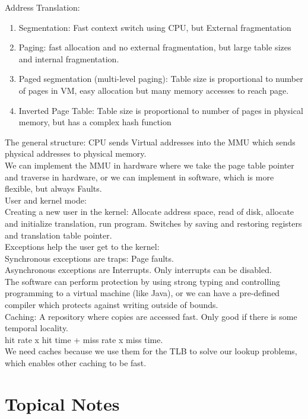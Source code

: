 \documentclass[paper=a4, fontsize=11pt]{scrartcl} %
\numberwithin{equation}{section} %
\numberwithin{figure}{section} %
\numberwithin{table}{section} %
\begin{document}
Address Translation:
\begin{enumerate}
	\item Segmentation: Fast context switch using CPU, but External fragmentation
    \item Paging: fast allocation and no external fragmentation, but large table sizes and internal fragmentation.
    \item Paged segmentation (multi-level paging): Table size is proportional to number of pages in VM, easy allocation but many memory accesses to reach page.
    \item Inverted Page Table: Table size is proportional to number of pages in physical memory, but has a complex hash function
\end{enumerate}
The general structure: CPU sends Virtual addresses into the MMU which sends physical addresses to physical memory. \\
We can implement the MMU in hardware where we take the page table pointer and traverse in hardware, or we can implement in software, which is more flexible, but always Faults. \\
User and kernel mode: \\
Creating a new user in the kernel: Allocate address space, read of disk, allocate and initialize translation, run program. Switches by saving and restoring registers and translation table pointer. \\
Exceptions help the user get to the kernel:\\ Synchronous exceptions are traps: Page faults. \\
Asynchronous exceptions are Interrupts. Only interrupts can be disabled. \\
The software can perform protection by using strong typing and controlling programming to a virtual machine (like Java), or we can have a pre-defined compiler which protects against writing outside of bounds. \\
Caching: A repository where copies are accessed fast. Only good if there is some temporal locality. \\
hit rate x hit time + miss rate x miss time. \\
We need caches because we use them for the TLB to solve our lookup problems, which enables other caching to be fast. \\

























\section{Topical Notes}
\end{document}
